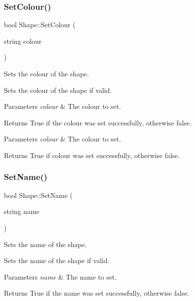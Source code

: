 \subsubsection{\texorpdfstring{SetColour()}{SetColour()}}
{\footnotesize\ttfamily bool Shape\+::\+Set\+Colour (\begin{DoxyParamCaption}\item[{string}]{colour }\end{DoxyParamCaption})}



Sets the colour of the shape. 

Sets the colour of the shape if valid.


\begin{DoxyParams}{Parameters}
{\em colour} & The colour to set. \\
\hline
\end{DoxyParams}
\begin{DoxyReturn}{Returns}
True if the colour was set successfully, otherwise false.
\end{DoxyReturn}

\begin{DoxyParams}{Parameters}
{\em colour} & The colour to set. \\
\hline
\end{DoxyParams}
\begin{DoxyReturn}{Returns}
True if colour was set successfully, otherwise false. 
\end{DoxyReturn}
\mbox{\label{class_shape_af47e082e8a48ae1c083d3acf0d7a059f}} 
\subsubsection{\texorpdfstring{SetName()}{SetName()}}
{\footnotesize\ttfamily bool Shape\+::\+Set\+Name (\begin{DoxyParamCaption}\item[{string}]{name }\end{DoxyParamCaption})}



Sets the name of the shape. 

Sets the name of the shape if valid.


\begin{DoxyParams}{Parameters}
{\em name} & The name to set. \\
\hline
\end{DoxyParams}
\begin{DoxyReturn}{Returns}
True if the name was set successfully, otherwise false.
\end{DoxyReturn}

